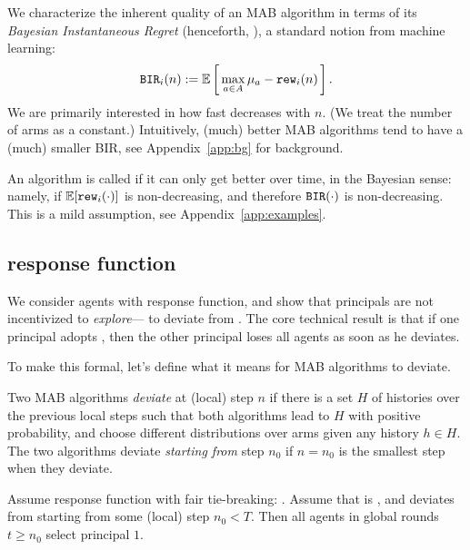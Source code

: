 We characterize the inherent quality of an MAB algorithm in terms of its \emph{Bayesian Instantaneous Regret} (henceforth, \BIR), a standard notion from machine learning:
\begin{align}\label{eq:theory-BIR-defn}
\BIR_i(n) := \E\sbr{ \max_{a\in A} \mu_a - \rew_i(n)}.
\end{align}
We are primarily interested in how fast \BIR decreases with $n$. (We treat the number of arms as a constant.) Intuitively, (much) better MAB algorithms tend to have a (much) smaller BIR, see Appendix~\ref{app:bg} for background.

An algorithm is called \emph{\bmonotone} if it can only get better over time, in the Bayesian sense: namely, if $\E[\rew_i(\cdot)]$ is non-decreasing, and therefore $\mathtt{BIR}(\cdot)$ is non-decreasing. This is a mild assumption, see
Appendix~\ref{app:examples}.



\subsection{\HardMax response function}
\label{sec:theory-HM}


We consider agents with \HardMax response function, and show that principals are not incentivized to \emph{explore}--- \ie to deviate from \DynGreedy. The core technical result is that if one principal adopts \DynGreedy, then the other principal loses all agents as soon as he deviates. 

To make this formal, let's define what it means for MAB algorithms to deviate.

\begin{definition}
Two MAB algorithms \emph{deviate} at (local) step $n$ if there is a set $H$ of histories over the previous local steps such that both algorithms lead to $H$ with positive probability, and choose different distributions over arms given any history $h\in H$. The two algorithms deviate \emph{starting from} step $n_0$ if $n=n_0$ is the smallest step when they deviate.
\end{definition}

\begin{theorem}\label{thm:DG-dominance}
Assume \HardMax response function with fair tie-breaking: . Assume that \alg[1] is \DynGreedy, and \alg[2] deviates from \DynGreedy starting from some (local) step $n_0<T$. Then all agents in global rounds $t\geq n_0$ select principal $1$.
\end{theorem}

